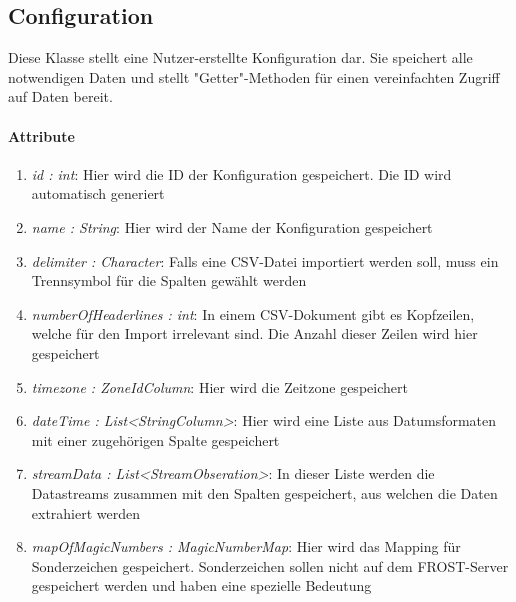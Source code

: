 \subsection*{Configuration}\label{config}
Diese Klasse stellt eine Nutzer-erstellte Konfiguration dar. 
Sie speichert alle notwendigen Daten und stellt "{Getter}"{-Methoden} für einen vereinfachten Zugriff auf Daten bereit.

\paragraph{Attribute}

\begin{enumerate}[-]
	\item \textit{id : int}: Hier wird die ID der Konfiguration gespeichert. Die ID wird automatisch generiert
	
	\item \textit{name : String}: Hier wird der Name der Konfiguration gespeichert
	
	\item \textit{delimiter : Character}: Falls eine CSV-Datei importiert werden soll, muss ein Trennsymbol für die Spalten gewählt werden
	
	\item \textit{numberOfHeaderlines : int}: In einem CSV-Dokument gibt es Kopfzeilen, welche für den Import irrelevant sind. Die Anzahl dieser Zeilen wird hier gespeichert
	
	\item \textit{timezone : ZoneIdColumn}: Hier wird die Zeitzone gespeichert
	
	\item \textit{dateTime : List<StringColumn>}: Hier wird eine Liste aus Datumsformaten mit einer zugehörigen Spalte gespeichert 
	
	\item \textit{streamData : List<StreamObseration>}: In dieser Liste werden die Datastreams zusammen mit den Spalten gespeichert, aus welchen die Daten extrahiert werden
	
	\item \textit{mapOfMagicNumbers : MagicNumberMap}: Hier wird das Mapping für Sonderzeichen gespeichert. Sonderzeichen sollen nicht auf dem FROST-Server gespeichert werden und haben eine spezielle Bedeutung
\end{enumerate}

